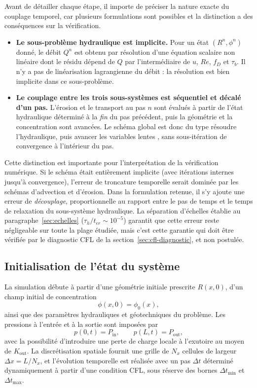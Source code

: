 \documentclass[11pt,a4paper]{report}
\newcommand{\kout}{K_{\mathrm{out}}}
\newcommand{\ter}{{t_{er}}}
\newcommand{\dt}{\Delta t}
\begin{document}
Avant de détailler chaque étape, il importe de préciser la nature exacte du couplage temporel, car
plusieurs formulations sont possibles et la distinction a des conséquences sur la vérification.

\begin{itemize}
  \item \textbf{Le sous-problème hydraulique est implicite.} Pour un état \((R^n,\phi^n)\) donné, le débit
        \(Q^n\) est obtenu par résolution d'une équation scalaire non linéaire dont le résidu dépend de
        \(Q\) par l'intermédiaire de \(u\), \(Re\), \(f_D\) et \(\tau_b\). Il n'y a pas de linéarisation
        lagrangienne du débit : la résolution est bien implicite dans ce sous-problème.
  \item \textbf{Le couplage entre les trois sous-systèmes est séquentiel et décalé d'un pas.} L'érosion et
        le transport au pas \(n\) sont évalués à partir de l'état hydraulique déterminé à la
        \emph{fin} du pas précédent, puis la géométrie et la concentration sont avancées. Le schéma
        global est donc du type \og résoudre l'hydraulique, puis avancer les variables lentes \fg{}, sans
        sous-itération de convergence à l'intérieur du pas.
\end{itemize}
Cette distinction est importante pour l'interprétation de la vérification numérique. Si le schéma était
entièrement implicite (avec itérations internes jusqu'à convergence), l'erreur de troncature temporelle
serait dominée par les schémas d'advection et d'érosion. Dans la formulation retenue, il s'y ajoute une
erreur de \emph{découplage}, proportionnelle au rapport entre le pas de temps et le temps de relaxation du
sous-système hydraulique. La séparation d'échelles établie au paragraphe~\ref{sec:echelles}
(\(\tau_h/\ter \sim 10^{-5}\)) garantit que cette erreur reste négligeable sur toute la plage étudiée, mais
c'est cette garantie qui doit être vérifiée par le diagnostic CFL de la section~\ref{sec:cfl-diagnostic},
et non postulée.

\subsection{Initialisation de l'état du système}

La simulation débute à partir d'une géométrie initiale prescrite \(R(x,0)\), d'un champ initial de
concentration
\begin{equation}
\phi(x,0) = \phi_0(x),
\label{eq:ci}
\end{equation}
ainsi que des paramètres hydrauliques et géotechniques du problème. Les pressions à l'entrée et à la
sortie sont imposées par
\begin{equation}
p(0,t) = P_{\mathrm{in}},
\qquad
p(L,t) = P_{\mathrm{out}},
\label{eq:cl}
\end{equation}
avec la possibilité d'introduire une perte de charge locale à l'exutoire au moyen de \(\kout\). La
discrétisation spatiale fournit une grille de \(N_x\) cellules de largeur \(\Delta x = L/N_x\), et
l'évolution temporelle est réalisée avec un pas \(\dt\) déterminé dynamiquement à partir d'une condition
CFL, sous réserve des bornes \(\dt_{\min}\) et \(\dt_{\max}\).
\end{document}
